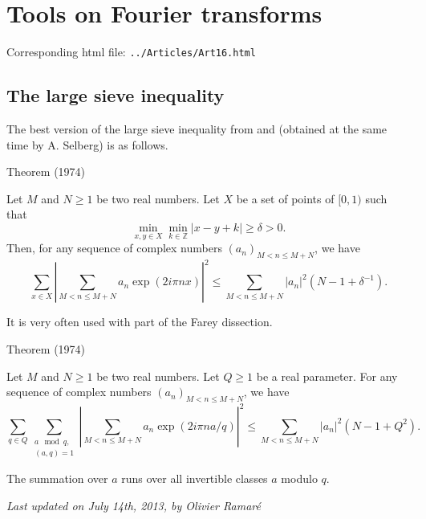 \chapter{  Tools on Fourier transforms}

Corresponding html file: \texttt{../Articles/Art16.html}










\section{The large sieve inequality}


The best version of the large sieve inequality from
\cite{Montgomery-Vaughan*74}
and
\cite{Montgomery-Vaughan*73}
(obtained at the same time by A. Selberg) is as follows.
\par 
\begin{thm}{Theorem (1974)}

Let $M$ and $N\ge 1$ be two real numbers. Let $X$ be a set of points of
$[0,1)$ such that 
$$
\min_{x,y\in X}\min_{k\in\mathbb{Z}}|x-y+k|\ge \delta>0.
$$
Then, for any sequence of complex numbers $(a_n)_{M < n\le M+N}$, we have
$$
\sum_{x\in X}\left|
\sum_{M < n\le M+N} a_n \exp(2i\pi nx)
\right|^2
\le \sum_{M < n\le M+N}|a_n|^2 (N-1+\delta^{-1}).
$$
\end{thm}


It is very often used with part of the Farey dissection.
\par 
\begin{thm}{Theorem (1974)}

Let $M$ and $N\ge 1$ be two real numbers. Let $Q\ge1$ be a real parameter.
For any sequence of complex numbers $(a_n)_{M < n\le M+N}$, we have
$$
\sum_{q\in Q}\sum_{\substack{a\mod q,\\ (a,q)=1}}\left|
\sum_{M < n\le M+N} a_n \exp(2i\pi na/q)
\right|^2
\le \sum_{M < n\le M+N}|a_n|^2 (N-1+Q^2).
$$
\end{thm}

The summation over $a$ runs over all invertible classes $a$ modulo $q$.


 
 








  
\begin{flushright}\small\sl{}   Last updated on July 14th, 2013, by Olivier Ramar\'e
 \end{flushright}















